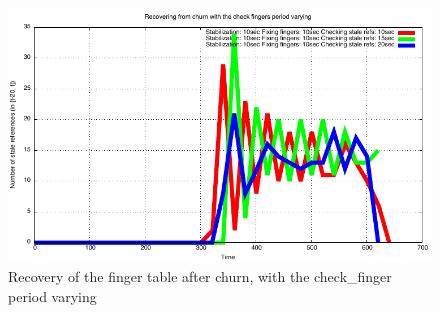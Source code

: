 \documentclass[a4paper, 11pt]{article}
\theoremstyle{plain}
\theoremstyle{definition}
\begin{document}
    
    \begin{figure}[h]
      \centering
      \includegraphics{plots/Recovery-SR-check-fingers.pdf}
      \caption{Recovery of the finger table after churn, with the check\_finger period varying}
      \label{fig:Rec-SR-check-finger}
    \end{figure}



    
    
    












	
\end{document}
